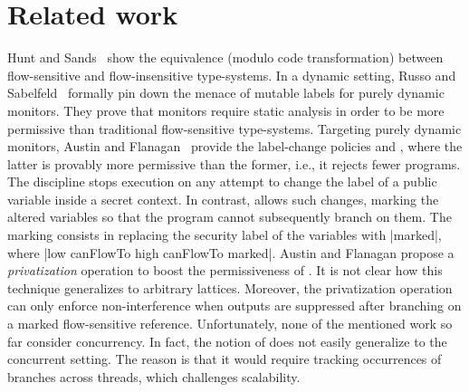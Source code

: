 \section{Related work}
\label{sec:related}


Hunt and Sands~\citep{Hunt:2006} show the equivalence (modulo code
transformation) between flow-sensitive and flow-insensitive type-systems. 
In a dynamic setting, Russo and Sabelfeld~\citep{Russo:2010} formally pin down
the menace of mutable labels for purely dynamic monitors. They prove that
monitors require static analysis in order to be more permissive than traditional
flow-sensitive type-systems. Targeting purely dynamic monitors, Austin and
Flanagan~\citep{Austin:Flanagan:PLAS09,Austin:Flanagan:PLAS10} provide the
label-change policies \emph{\nsu} and \emph{\pu}, where the latter is provably
more permissive than the former, i.e., it rejects fewer programs. The
{\nsu} discipline stops  execution on any attempt to change the label of a
public variable inside a secret context. In contrast, {\pu} allows such changes,
marking the altered variables so that the program cannot subsequently branch on
them. The marking consists in replacing the security label of the variables with
|marked|, where |low canFlowTo high canFlowTo marked|.  Austin and Flanagan
propose a \emph{privatization} operation to boost the permissiveness of {\pu}.
It is not clear how this technique generalizes to arbitrary lattices. Moreover,
the privatization operation can only enforce non-interference when outputs are
suppressed after branching on a marked flow-sensitive reference. Unfortunately,
none of the mentioned work so far consider concurrency. In fact, the notion of
{\pu} does not easily generalize to the concurrent setting. The reason is that
it would require tracking occurrences of branches across threads, which
challenges scalability.

